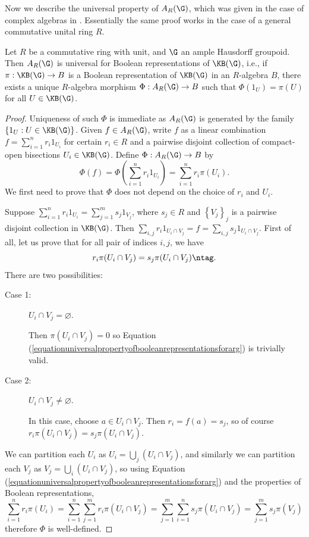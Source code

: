 Now we describe the universal property of $A_R(\G)$, which was given in the case of complex algebras in \cite[Theorem~3.10]{MR3274831}. Essentially the same proof works in the case of a general commutative unital ring $R$.

\begin{theorem}\label{theoremuniversalpropertysteinberg}
Let $R$ be a commutative ring with unit, and $\G$ an ample Hausdorff groupoid. Then $A_R(\G)$ is universal for Boolean representations of $\KB(\G)$, i.e., if $\pi:\KB(\G)\to B$ is a Boolean representation of $\KB(\G)$ in an $R$-algebra $B$, there exists a unique $R$-algebra morphism $\Phi: A_R(\G)\to B$ such that $\Phi(1_U)=\pi(U)$ for all $U\in\KB(\G)$.
\end{theorem}
\begin{proof}
Uniqueness of such $\Phi$ is immediate as $A_R(\G)$ is generated by the family $\left\{1_U:U\in\KB(\G)\right\}$. Given $f\in A_R(\G)$, write $f$ as a linear combination $f=\sum_{i=1}^n r_i1_{U_i}$ for certain $r_i\in R$ and a pairwise disjoint collection of compact-open bisections $U_i\in\KB(\G)$. Define $\Phi: A_R(\G)\to B$ by
\[\Phi(f)=\Phi\left(\sum_{i=1}^n r_i1_{U_i}\right)=\sum_{i=1}^n r_i\pi(U_i).\]
We first need to prove that $\Phi$ does not depend on the choice of $r_i$ and $U_i$.

Suppose $\sum_{i=1}^n r_i1_{U_i}=\sum_{j=1}^m s_j1_{V_j}$, where $s_j\in R$ and $\left\{V_j\right\}_j$ is a pairwise disjoint collection in $\KB(\G)$. Then $\sum_{i,j}r_i1_{U_i\cap V_j}=f=\sum_{i,j}s_j 1_{U_i\cap V_j}$. First of all, let us prove that for all pair of indices $i,j$, we have
\[r_i\pi(U_i\cap V_j)=s_j\pi(U_i\cap V_j)\ntag\label{equationuniversalpropertyofbooleanrepresentationsforarg}.\]
There are two possibilities:
\begin{description}
\item[Case 1:] $U_i\cap V_j=\varnothing$.

Then $\pi(U_i\cap V_j)=0$ so Equation (\ref{equationuniversalpropertyofbooleanrepresentationsforarg}) is trivially valid.
\item[Case 2:] $U_i\cap V_j\neq\varnothing$.

In this case, choose $a\in U_i\cap V_j$. Then $r_i=f(a)=s_j$, so of course $r_i\pi(U_i\cap V_j)=s_j\pi(U_i\cap V_j)$.
\end{description}

We can partition each $U_i$ as $U_i=\bigcup_j (U_i\cap V_j)$, and similarly we can partition each $V_j$ as $V_j=\bigcup_i (U_i\cap V_j)$, so using Equation (\ref{equationuniversalpropertyofbooleanrepresentationsforarg}) and the properties of Boolean representations,
\[\sum_{i=1}^n r_i\pi(U_i)=\sum_{i=1}^n\sum_{j=1}^m r_i\pi(U_i\cap V_j)=\sum_{j=1}^m\sum_{i=1}^n s_j\pi(U_i\cap V_j)=\sum_{j=1}^m s_j\pi(V_j)\]
therefore $\Phi$ is well-defined.


\end{proof}

